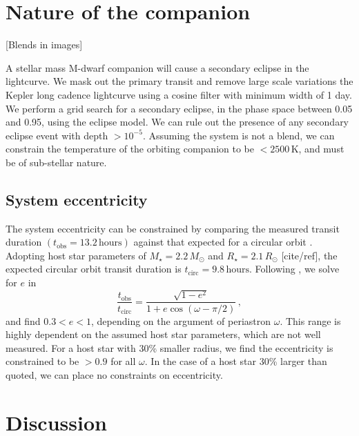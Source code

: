 \documentclass[apjl]{emulateapj}
\begin{document}
\section{Nature of the companion}
\label{sec:nature-companion}

[Blends in images]

A stellar mass M-dwarf companion will cause a secondary eclipse in the
lightcurve. We mask out the primary transit and remove large scale
variations the Kepler long cadence lightcurve using a cosine filter
with minimum width of 1 day. We perform a grid
search for a secondary eclipse, in the phase space between 0.05 and
0.95, using the \citet{Mandel2002} eclipse model. We can rule out the
presence of any secondary eclipse event with depth
$>10^{-5}$. Assuming the system is not a blend, we can constrain the
temperature of the orbiting companion to be $< 2500\,\text{K}$, and
must be of sub-stellar nature.

\subsection{System eccentricity}
\label{sec:system-eccentricity}

The system eccentricity can be constrained by comparing the measured
transit duration $(t_\text{obs}=13.2\,\text{hours})$ against that expected for a circular
orbit \citep[e.g.][]{Barnes2007,Burke2008,Kane2012}. Adopting host star
parameters of $M_\star = 2.2\,M_\odot$ and $R_\star = 2.1\,R_\odot$
[cite/ref], the expected circular orbit transit duration is
$t_\text{circ} =9.8\,\text{hours}$. Following \citet{Burke2008}, we
solve for $e$ in
\begin{equation}
  \label{eq:ecc}
  \frac{t_\text{obs}}{t_\text{circ}} = \frac{\sqrt{1-e^2}}{1+e \cos(\omega-\pi/2)}\,,
\end{equation}
and find $0.3 < e < 1$, depending on the argument of periastron $\omega$. This range is highly
dependent on the assumed host star parameters, which are not well
measured. For a host star with 30\% smaller radius, we find the
eccentricity is constrained to be $>0.9$ for all $\omega$. In the case
of a host star 30\% larger than quoted, we can place no constraints on
eccentricity. 


\section{Discussion}
\label{sec:discussion}
\end{document}
